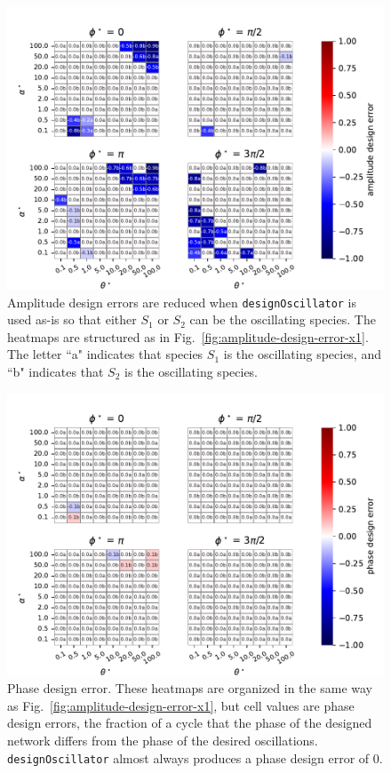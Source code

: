 \documentclass{bmcart}
\newcommand{\fig}[1]{Fig.~\ref{#1}}
\begin{document}
\begin{backmatter}
\begin{figure}
        \centering
         \includegraphics[scale=0.75]{figures/evaluation_plot_alphadev_both.pdf}
         \caption[]{Amplitude design errors are reduced when {\tt designOscillator} is used as-is so that either $S_1$ or $S_2$ can be the oscillating species. The heatmaps are structured as in \fig{fig:amplitude-design-error-x1}. The letter ``a" indicates that species $S_1$ is the oscillating species, and ``b" indicates that $S_2$ is the oscillating species.} 
         \label{fig:amplitude-design-error-both}
\end{figure}


\begin{figure}
        \centering
         \includegraphics[scale=0.75]{figures/evaluation_plot_phidev_both.pdf}
         \caption[]{Phase design error. These heatmaps are organized in the same way as \fig{fig:amplitude-design-error-x1}, but cell values are phase design errors, the fraction of a cycle that the phase of the designed network differs from the phase of the desired oscillations. {\tt designOscillator} almost always produces a phase design error of 0.} 
         \label{fig:phase-design-error-both}
\end{figure}



\end{backmatter}
\end{document}
